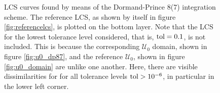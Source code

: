 \begin{figure}[htpb]
    \centering
    
    \caption[LCS curves found by means of the Dormand-Prince 8(7) integration
    scheme]{
        LCS curves found by means of the Dormand-Prince 8(7) integration
        scheme. The reference LCS, as shown by itself in figure
        \ref{fig:referencelcs}, is plotted on the bottom layer. Note that
        the LCS for the lowest tolerance level considered, that is,
        $\textnormal{tol}=0.1$, is not included. This is because the
        corresponding $\mathcal{U}_{0}$ domain, shown in figure
        \ref{fig:u0_dp87}, and the reference $\mathcal{U}_{0}$, shown in figure
        \ref{fig:u0_domain} are unlike one another. Here, there are visible
        dissimilarities for for all tolerance levels $\textnormal{tol}>10^{-6}$,
        in particular in the lower left corner.}
    \label{fig:lcs_rkdp87}
\end{figure}
